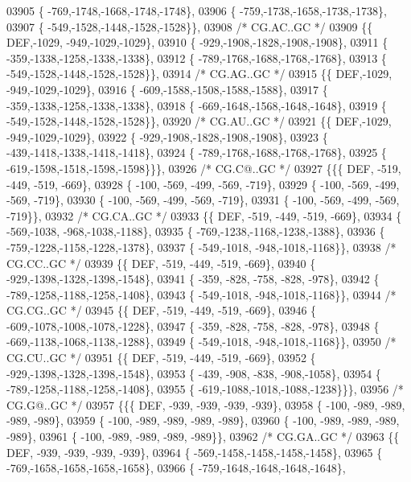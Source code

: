 \begin{DoxyCode}
03905 \{ -769,-1748,-1668,-1748,-1748\},
03906 \{ -759,-1738,-1658,-1738,-1738\},
03907 \{ -549,-1528,-1448,-1528,-1528\}\},
03908 \textcolor{comment}{/* CG.AC..GC */}
03909 \{\{  DEF,-1029, -949,-1029,-1029\},
03910 \{ -929,-1908,-1828,-1908,-1908\},
03911 \{ -359,-1338,-1258,-1338,-1338\},
03912 \{ -789,-1768,-1688,-1768,-1768\},
03913 \{ -549,-1528,-1448,-1528,-1528\}\},
03914 \textcolor{comment}{/* CG.AG..GC */}
03915 \{\{  DEF,-1029, -949,-1029,-1029\},
03916 \{ -609,-1588,-1508,-1588,-1588\},
03917 \{ -359,-1338,-1258,-1338,-1338\},
03918 \{ -669,-1648,-1568,-1648,-1648\},
03919 \{ -549,-1528,-1448,-1528,-1528\}\},
03920 \textcolor{comment}{/* CG.AU..GC */}
03921 \{\{  DEF,-1029, -949,-1029,-1029\},
03922 \{ -929,-1908,-1828,-1908,-1908\},
03923 \{ -439,-1418,-1338,-1418,-1418\},
03924 \{ -789,-1768,-1688,-1768,-1768\},
03925 \{ -619,-1598,-1518,-1598,-1598\}\}\},
03926 \textcolor{comment}{/* CG.C@..GC */}
03927 \{\{\{  DEF, -519, -449, -519, -669\},
03928 \{ -100, -569, -499, -569, -719\},
03929 \{ -100, -569, -499, -569, -719\},
03930 \{ -100, -569, -499, -569, -719\},
03931 \{ -100, -569, -499, -569, -719\}\},
03932 \textcolor{comment}{/* CG.CA..GC */}
03933 \{\{  DEF, -519, -449, -519, -669\},
03934 \{ -569,-1038, -968,-1038,-1188\},
03935 \{ -769,-1238,-1168,-1238,-1388\},
03936 \{ -759,-1228,-1158,-1228,-1378\},
03937 \{ -549,-1018, -948,-1018,-1168\}\},
03938 \textcolor{comment}{/* CG.CC..GC */}
03939 \{\{  DEF, -519, -449, -519, -669\},
03940 \{ -929,-1398,-1328,-1398,-1548\},
03941 \{ -359, -828, -758, -828, -978\},
03942 \{ -789,-1258,-1188,-1258,-1408\},
03943 \{ -549,-1018, -948,-1018,-1168\}\},
03944 \textcolor{comment}{/* CG.CG..GC */}
03945 \{\{  DEF, -519, -449, -519, -669\},
03946 \{ -609,-1078,-1008,-1078,-1228\},
03947 \{ -359, -828, -758, -828, -978\},
03948 \{ -669,-1138,-1068,-1138,-1288\},
03949 \{ -549,-1018, -948,-1018,-1168\}\},
03950 \textcolor{comment}{/* CG.CU..GC */}
03951 \{\{  DEF, -519, -449, -519, -669\},
03952 \{ -929,-1398,-1328,-1398,-1548\},
03953 \{ -439, -908, -838, -908,-1058\},
03954 \{ -789,-1258,-1188,-1258,-1408\},
03955 \{ -619,-1088,-1018,-1088,-1238\}\}\},
03956 \textcolor{comment}{/* CG.G@..GC */}
03957 \{\{\{  DEF, -939, -939, -939, -939\},
03958 \{ -100, -989, -989, -989, -989\},
03959 \{ -100, -989, -989, -989, -989\},
03960 \{ -100, -989, -989, -989, -989\},
03961 \{ -100, -989, -989, -989, -989\}\},
03962 \textcolor{comment}{/* CG.GA..GC */}
03963 \{\{  DEF, -939, -939, -939, -939\},
03964 \{ -569,-1458,-1458,-1458,-1458\},
03965 \{ -769,-1658,-1658,-1658,-1658\},
03966 \{ -759,-1648,-1648,-1648,-1648\},

\end{DoxyCode}
